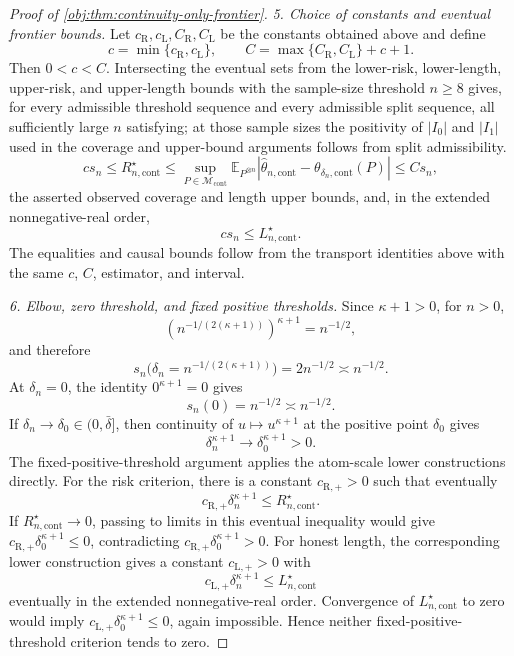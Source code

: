 \begin{proof}[Proof of \cref{obj:thm:continuity-only-frontier}]
\emph{5. Choice of constants and eventual frontier bounds.}
Let \(c_{\mathrm R},c_{\mathrm L},C_{\mathrm R},C_{\mathrm L}\) be the constants obtained above and define
\[
c=\min\{c_{\mathrm R},c_{\mathrm L}\},
\qquad
C=\max\{C_{\mathrm R},C_{\mathrm L}\}+c+1 .
\]
Then \(0<c<C\).  Intersecting the eventual sets from the lower-risk, lower-length, upper-risk, and upper-length bounds with the sample-size threshold \(n\geq8\) gives, for every admissible threshold sequence and every admissible split sequence, all sufficiently large \(n\) satisfying; at those sample sizes the positivity of \(|I_0|\) and \(|I_1|\) used in the coverage and upper-bound arguments follows from split admissibility.
\[
c s_n\leq R_{n,\mathrm{cont}}^\star
\leq
\sup_{P\in\mathcal M_{\mathrm{cont}}}
\mathbb E_{P^{\otimes n}}
\left|\widehat\theta_{n,\mathrm{cont}}-\theta_{\delta_n,\mathrm{cont}}(P)\right|
\leq C s_n,
\]
the asserted observed coverage and length upper bounds, and, in the extended nonnegative-real order,
\[
c s_n\leq L_{n,\mathrm{cont}}^\star.
\]
The equalities and causal bounds follow from the transport identities above with the same \(c\), \(C\), estimator, and interval.

\emph{6. Elbow, zero threshold, and fixed positive thresholds.}
Since \(\kappa+1>0\), for \(n>0\),
\[
\left(n^{-1/(2(\kappa+1))}\right)^{\kappa+1}=n^{-1/2},
\]
and therefore
\[
s_n\bigl(\delta_n=n^{-1/(2(\kappa+1))}\bigr)=2n^{-1/2}\asymp n^{-1/2}.
\]
At \(\delta_n=0\), the identity \(0^{\kappa+1}=0\) gives
\[
s_n(0)=n^{-1/2}\asymp n^{-1/2}.
\]
If \(\delta_n\to\delta_0\in(0,\bar\delta]\), then continuity of \(u\mapsto u^{\kappa+1}\) at the positive point \(\delta_0\) gives
\[
\delta_n^{\kappa+1}\to\delta_0^{\kappa+1}>0 .
\]
The fixed-positive-threshold argument applies the atom-scale lower constructions directly.  For the risk criterion, there is a constant \(c_{\mathrm R,+}>0\) such that eventually
\[
c_{\mathrm R,+}\delta_n^{\kappa+1}
\leq R_{n,\mathrm{cont}}^\star .
\]
If \(R_{n,\mathrm{cont}}^\star\to0\), passing to limits in this eventual inequality would give
\(c_{\mathrm R,+}\delta_0^{\kappa+1}\leq0\), contradicting
\(c_{\mathrm R,+}\delta_0^{\kappa+1}>0\).  For honest length, the corresponding lower construction gives a constant \(c_{\mathrm L,+}>0\) with
\[
c_{\mathrm L,+}\delta_n^{\kappa+1}
\leq L_{n,\mathrm{cont}}^\star
\]
eventually in the extended nonnegative-real order.  Convergence of \(L_{n,\mathrm{cont}}^\star\) to zero would imply
\(c_{\mathrm L,+}\delta_0^{\kappa+1}\leq0\), again impossible.  Hence neither fixed-positive-threshold criterion tends to zero.
\end{proof}

